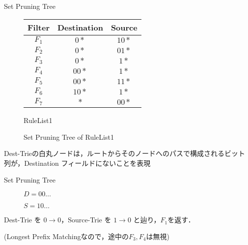 \documentclass[a4paper,10pt]{jarticle}
\makeatletter
\newcommand{\tblcaption}[1]{\def\@captype{table}\caption{#1}}
\makeatother
\begin{document}
\begin{frame}{Set Pruning Tree}

\begin{figure}[h]
 \def\@captype{table}
 \begin{minipage}[t]{.3\textwidth}
  {\scriptsize
  {\centering
  \begin{tabular}{c|c|c} 
   Filter   & Destination & Source \\ \hline
   $F_{1} $ & $0*$        & $10*$   \\ \hline
   $F_{2} $ & $0*$        & $01*$   \\ \hline
   $F_{3} $ & $0*$        & $1*$   \\ \hline
   $F_{4} $ & $00*$       & $1*$   \\ \hline
   $F_{5} $ & $00*$       & $11*$   \\ \hline
   $F_{6} $ & $10*$       & $1*$   \\ \hline
   $F_{7} $ & $*$         & $00*$   
  \end{tabular}
  \tblcaption{RuleList1}

  }
  }
  \end{minipage}
  \hfill
  \begin{minipage}[c]{.6\textwidth}
   \vspace{8mm}
   \scalebox{0.45}{}
   \vspace{-6mm}
   \caption{Set Pruning Tree of RuleList1}
  \end{minipage}
\end{figure}

\vspace{3mm}

Dest-Trieの白丸ノードは，ルートからそのノードへのパスで構成されるビット列が，Destination フィールドにないことを表現

\end{frame}

\begin{frame}{Set Pruning Tree}

\begin{figure}[h]
 \def\@captype{table}
 \begin{minipage}[c]{.55\textwidth}
   \scalebox{0.45}{}
  \end{minipage}
  \hfill
  \begin{minipage}[c]{.3\textwidth}
  $D = 00 \dots$
  \par
  $S = 10 \dots$
  \end{minipage}
\end{figure}

\vspace{5mm}
Dest-Trie を $0 \to 0$，Source-Trie を $1 \to 0$ と辿り，$F_{1}$を返す．
\par
\vspace{3mm}
(Longest Prefix Matchingなので，途中の$F_{3}, F_{4}$は無視)
\end{frame}
\end{document}
